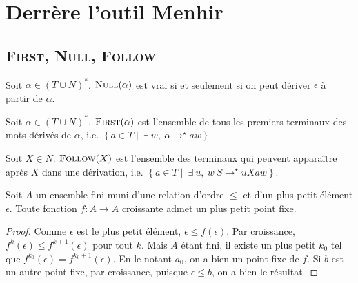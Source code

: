 \documentclass{cours}
\begin{document}
\section{Derrère l'outil Menhir}
\subsection{\textsc{First, Null, Follow}}
\begin{definition}
    Soit $\alpha \in (T \cup N)^{*}$. $\textsc{Null}(\alpha)$ est vrai si et seulement si on peut dériver $\epsilon$ à partir de $\alpha$.
\end{definition}
\begin{definition}
    Soit $\alpha \in (T \cup N)^{*}$. $\textsc{First}(\alpha)$ est l'ensemble de tous les premiers terminaux des mots dérivés de $\alpha$, i.e. $\left\{a \in T \mid\ \exists \ w, \ \alpha \rightarrow^{\star} aw\right\}$
\end{definition}
\begin{definition}
    Soit $X \in N$. $\textsc{Follow}(X)$ est l'ensemble des terminaux qui peuvent apparaître après $X$ dans une dérivation, i.e.
    $\left\{a \in T \mid\ \exists \ u,\ w \ S \rightarrow^{\star} uXaw \right\}$.
\end{definition}

\begin{theorem}[Tarski]
    Soit $A$ un ensemble fini muni d'une relation d'ordre $\leq$ et d'un plus petit élément $\epsilon$. Toute fonction $f : A \rightarrow A$ croissante admet un plus petit point fixe.
\end{theorem}
\begin{proof}
    Comme $\epsilon$ est le plus petit élément, $\epsilon \leq f(\epsilon)$. Par croissance, $f^{k}(\epsilon) \leq f^{k+1}(\epsilon)$ pour tout $k$. Mais $A$ étant fini, il existe un plus petit $k_{0}$ tel que $f^{k_{0}}(\epsilon) = f^{k_{0} + 1}(\epsilon)$. En le notant $a_{0}$, on a bien un point fixe de $f$. Si $b$ est un autre point fixe, par croissance, puisque $\epsilon \leq b$, on a bien le résultat.
\end{proof}
\end{document}
